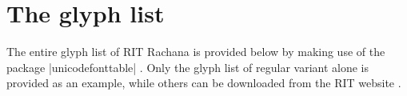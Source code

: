 \documentclass[onecolumn,final]{ltugboat}
\def\tsm{\small}
\def\rit{{\tsm RIT}\xspace}
\begin{document}
\section{The glyph list}

The entire glyph list of \rit Rachana is provided below by making use
of the package |unicodefonttable| \cite{unicodefonttable}.  Only the
glyph list of regular variant alone is provided as an example, while
others can be downloaded from the \rit website \cite{rit-home}.

\ifprint
\else
\fi


\RaggedRight\small



\makesignature
\end{document}
